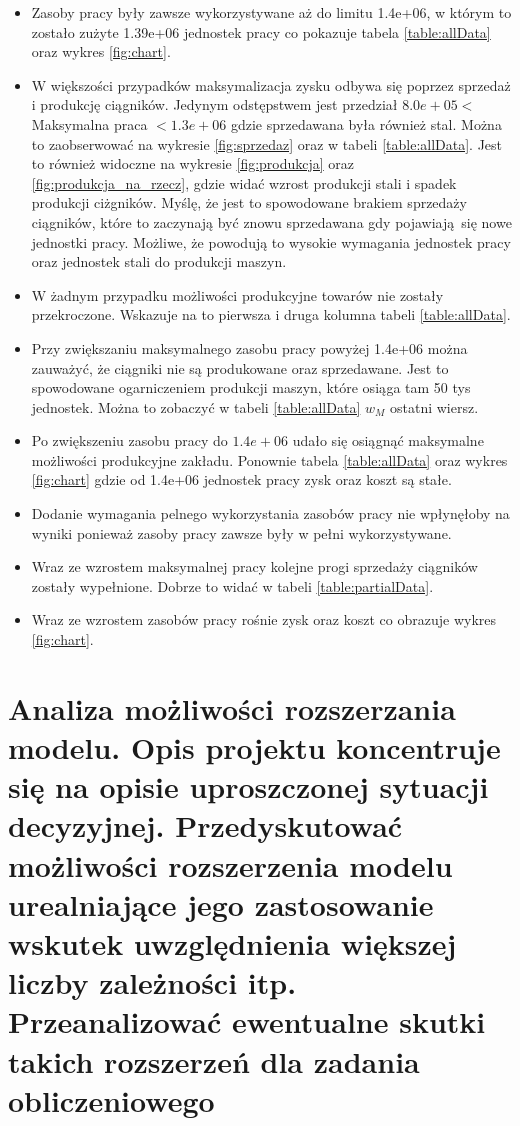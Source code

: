\documentclass{article}
\begin{document}
\begin{itemize}
  \item Zasoby pracy były zawsze wykorzystywane aż do limitu 1.4e+06, w którym to zostało zużyte 1.39e+06 jednostek pracy co pokazuje tabela \ref{table:allData} oraz wykres \ref{fig:chart}.
  \item W większości przypadków maksymalizacja zysku odbywa się poprzez sprzedaż i produkcję ciągników. Jedynym odstępstwem jest przedział $8.0e+05 < $ Maksymalna praca $ < 1.3e+06$ gdzie sprzedawana była również stal. 
    Można to zaobserwować na wykresie \ref{fig:sprzedaz} oraz w tabeli \ref{table:allData}. Jest to również widoczne na wykresie \ref{fig:produkcja} oraz \ref{fig:produkcja_na_rzecz}, gdzie widać wzrost produkcji stali i spadek produkcji ciżgników. Myślę, że jest to spowodowane brakiem sprzedaży ciągników, które to zaczynają być znowu sprzedawana gdy pojawiają się nowe jednostki pracy. Możliwe, że powodują to wysokie wymagania jednostek pracy oraz jednostek stali do produkcji maszyn. 
  \item W żadnym przypadku możliwości produkcyjne towarów nie zostały przekroczone. Wskazuje na to pierwsza i druga kolumna tabeli \ref{table:allData}.
  \item Przy zwiększaniu maksymalnego zasobu pracy powyżej 1.4e+06 można zauważyć, że ciągniki nie są produkowane oraz sprzedawane. Jest to spowodowane ogarniczeniem produkcji maszyn, które osiąga tam 50 tys jednostek. Można to zobaczyć w tabeli \ref{table:allData} $w_M$ ostatni wiersz.
  \item Po zwiększeniu zasobu pracy do $1.4e+06$ udało się osiągnąć maksymalne możliwości produkcyjne zakładu. Ponownie tabela \ref{table:allData} oraz wykres \ref{fig:chart} gdzie od 1.4e+06 jednostek pracy zysk oraz koszt są stałe.
  \item Dodanie wymagania pelnego wykorzystania zasobów pracy nie wpłynęłoby na wyniki ponieważ zasoby pracy zawsze były w pełni wykorzystywane.
  \item Wraz ze wzrostem maksymalnej pracy kolejne progi sprzedaży ciągników zostały wypełnione. Dobrze to widać w tabeli \ref{table:partialData}.
  \item Wraz ze wzrostem zasobów pracy rośnie zysk oraz koszt co obrazuje wykres \ref{fig:chart}.
\end{itemize}

\section{Analiza  możliwości  rozszerzania  modelu.  Opis  projektu  koncentruje  się  na  opisie uproszczonej  sytuacji  decyzyjnej.  Przedyskutować  możliwości  rozszerzenia  modelu urealniające  jego  zastosowanie  wskutek  uwzględnienia  większej  liczby  zależności  itp. Przeanalizować ewentualne skutki takich rozszerzeń dla zadania obliczeniowego}
\end{document}
